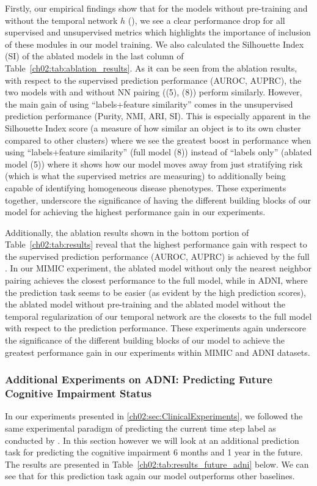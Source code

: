 


Firstly, our empirical findings show that for the models without pre-training and without the temporal network $h$ (), we see a clear performance drop for all supervised and unsupervised metrics which highlights the importance of inclusion of these modules in our model training.
We also calculated the Silhouette Index (SI) of the ablated models in the last column of Table~\ref{ch02:tab:ablation_results}.
As it can be seen from the ablation results, with respect to the supervised prediction performance (AUROC, AUPRC), the two models with and without NN pairing ((5), (8)) perform similarly.
However, the main gain of using “labels+feature similarity” comes in the unsupervised prediction performance (Purity, NMI, ARI, SI).
This is especially apparent in the Silhouette Index score (a measure of how similar an object is to its own cluster compared to other clusters) where we see the greatest boost in performance when using “labels+feature similarity” (full model (8)) instead of “labels only” (ablated model (5)) where it shows how our model moves away from just stratifying risk (which is what the supervised metrics are measuring) to additionally being capable of identifying homogeneous disease phenotypes.
These experiments together, underscore the significance of having the different building blocks of our model for achieving the highest performance gain in our experiments.

Additionally, the ablation results shown in the bottom portion of Table~\ref{ch02:tab:results} reveal that the highest performance gain with respect to the supervised prediction performance (AUROC, AUPRC) is achieved by the full .
In our MIMIC experiment, the ablated model without only the nearest neighbor pairing achieves the closest performance to the full model, while in ADNI, where the prediction task seems to be easier (as evident by the high prediction scores), the ablated model without pre-training and the ablated model without the temporal regularization of our temporal network are the closests to the full model with respect to the prediction performance.
These experiments again underscore the significance of the different building blocks of our model to achieve the greatest performance gain in our experiments within MIMIC and ADNI datasets.

\subsubsection{Additional Experiments on ADNI: Predicting Future Cognitive Impairment Status}
\label{ch02:sec:future_adni}
In our experiments presented in \ref{ch02:sec:ClinicalExperiments}, we followed the same experimental paradigm of predicting the current time step label as conducted by \cite{lee2020temporal}. 
In this section however we will look at an additional prediction task for predicting the cognitive impairment 6 months and 1 year in the future. 
The results are presented in Table~\ref{ch02:tab:results_future_adni} below. 
We can see that for this prediction task again our model outperforms other baselines.


